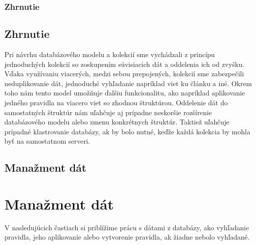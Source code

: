 %
%
{
	\subsubsection{Zhrnutie}
}
{
	\subsection{Zhrnutie}
}
\label{subsubsection:collections_summary}
Pri návrhu databázového modelu a kolekcií sme vychádzali z princípu jednoduchých kolekcií so zoskupením súvisiacich dát a oddelenia ich od zvyšku. Vďaka využívaniu viacerých, medzi sebou prepojených, kolekcií sme zabezpečili neduplikovanie dát, jednoduché vyhľadanie napríklad viet ku článku a iné. Okrem toho nám tento model umožňuje ďalšiu funkcionalitu, ako napríklad aplikovanie jedného pravidla na viacero viet so zhodnou štruktúrou. Oddelenie dát do samostatných štruktúr nám uľahčuje aj prípadne neskoršie rozšírenie databázového modelu alebo zmenu konkrétnych štruktúr. Taktiež uľahčuje prípadné klastrovanie databázy, ak by bolo nutné, keďže každá kolekcia by mohla byť na samostatnom serveri.


%
%
{
	\subsection{Manažment dát}
}
{
	\section{Manažment dát}
}
\label{subsection:data_management}
V nasledujúcich častiach si priblížime prácu s dátami z databázy, ako vyhľadanie pravidla, jeho aplikovanie alebo vytvorenie pravidla, ak žiadne nebolo vyhľadané.

